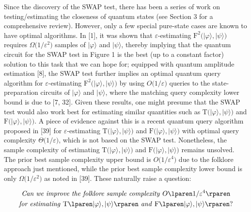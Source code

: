 \documentclass[10pt,a4paper]{article}
\begin{document}
Since the discovery of the SWAP test, there has been a series of work on testing/estimating the closeness of quantum states (see Section 3 for a comprehensive review).
However, only a few special pure-state cases are known to have optimal algorithms.
In [1], it was shown that $\varepsilon$-estimating $\mathrm{F}^{2}\lparen\lvert\varphi\rangle,\lvert\psi\rangle\rparen$ requires $\Omega\lparen 1/\varepsilon^{2}\rparen$ samples of
$\lvert\varphi\rangle$ and $\lvert\psi\rangle$, thereby implying that the quantum circuit for the SWAP test in Figure 1 is the best (up to a constant factor) solution to this task that we can hope for;
equipped with quantum amplitude estimation [8], the SWAP test further implies an optimal quantum query algorithm for $\varepsilon$-estimating $\mathrm{F}^{2}\lparen\lvert\varphi\rangle,\lvert\psi\rangle\rparen$ by using $O\lparen 1/\varepsilon\rparen$ queries to the state-preparation circuits of $\lvert\varphi\rangle$ and $\lvert\psi\rangle$, where the matching query complexity lower bound is due to [7, 32].
Given these results, one might presume that the SWAP test would also work best for estimating similar quantities such as $\mathrm{T}\lparen\lvert\varphi\rangle,\lvert\psi\rangle\rparen$ and $\mathrm{F}\lparen\lvert\varphi\rangle,\lvert\psi\rangle\rparen$.
A piece of evidence against this is a recent quantum query algorithm proposed in [39] for $\varepsilon$-estimating $\mathrm{T}\lparen\lvert\varphi\rangle,\lvert\psi\rangle\rparen$ and $\mathrm{F}\lparen\lvert\varphi\rangle,\lvert\psi\rangle\rparen$ with optimal query complexity $\Theta\lparen 1/\varepsilon\rparen$, which is not based on the SWAP test.
Nonetheless, the sample complexity of estimating $\mathrm{T}\lparen\lvert\varphi\rangle,\lvert\psi\rangle\rparen$ and $\mathrm{F}\lparen\lvert\varphi\rangle,\lvert\psi\rangle\rparen$ remains unsolved.
The prior best sample complexity upper bound is $O\lparen 1/\varepsilon^{4}\rparen$ due to the folklore approach just mentioned, while the prior best sample complexity lower bound is only $\Omega\lparen 1/\varepsilon^{2}\rparen$ as noted in [39].
These naturally raise a question:\par


\[\begin{gathered}
\text{\emph{Can we improve the folklore sample complexity }}O\lparen 1/\varepsilon^{4}\rparen \\
\text{\emph{for estimating }}\mathrm{T}\lparen\lvert\varphi\rangle,\lvert\psi\rangle\rparen\text{\emph{ and }}\mathrm{F}\lparen\lvert\varphi\rangle,\lvert\psi\rangle\rparen\text{?}
\end{gathered}\]
\end{document}
